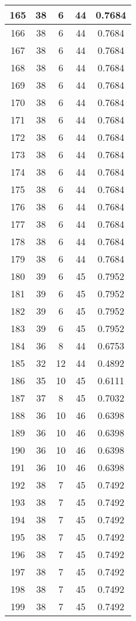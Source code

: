 \documentclass[letterpaper, 12pt]{article}
\begin{document}
\begin{longtable}{|c|c|c|c|c|}
\hline
165 & 38 & 6 & 44 & 0.7684 \\
\hline
166 & 38 & 6 & 44 & 0.7684 \\
\hline
167 & 38 & 6 & 44 & 0.7684 \\
\hline
168 & 38 & 6 & 44 & 0.7684 \\
\hline
169 & 38 & 6 & 44 & 0.7684 \\
\hline
170 & 38 & 6 & 44 & 0.7684 \\
\hline
171 & 38 & 6 & 44 & 0.7684 \\
\hline
172 & 38 & 6 & 44 & 0.7684 \\
\hline
173 & 38 & 6 & 44 & 0.7684 \\
\hline
174 & 38 & 6 & 44 & 0.7684 \\
\hline
175 & 38 & 6 & 44 & 0.7684 \\
\hline
176 & 38 & 6 & 44 & 0.7684 \\
\hline
177 & 38 & 6 & 44 & 0.7684 \\
\hline
178 & 38 & 6 & 44 & 0.7684 \\
\hline
179 & 38 & 6 & 44 & 0.7684 \\
\hline
180 & 39 & 6 & 45 & 0.7952 \\
\hline
181 & 39 & 6 & 45 & 0.7952 \\
\hline
182 & 39 & 6 & 45 & 0.7952 \\
\hline
183 & 39 & 6 & 45 & 0.7952 \\
\hline
184 & 36 & 8 & 44 & 0.6753 \\
\hline
185 & 32 & 12 & 44 & 0.4892 \\
\hline
186 & 35 & 10 & 45 & 0.6111 \\
\hline
187 & 37 & 8 & 45 & 0.7032 \\
\hline
188 & 36 & 10 & 46 & 0.6398 \\
\hline
189 & 36 & 10 & 46 & 0.6398 \\
\hline
190 & 36 & 10 & 46 & 0.6398 \\
\hline
191 & 36 & 10 & 46 & 0.6398 \\
\hline
192 & 38 & 7 & 45 & 0.7492 \\
\hline
193 & 38 & 7 & 45 & 0.7492 \\
\hline
194 & 38 & 7 & 45 & 0.7492 \\
\hline
195 & 38 & 7 & 45 & 0.7492 \\
\hline
196 & 38 & 7 & 45 & 0.7492 \\
\hline
197 & 38 & 7 & 45 & 0.7492 \\
\hline
198 & 38 & 7 & 45 & 0.7492 \\
\hline
199 & 38 & 7 & 45 & 0.7492 \\
\hline
\end{longtable}
\end{document}
